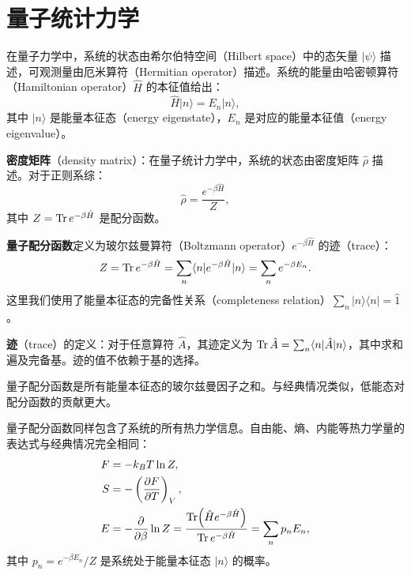 \section{量子统计力学}

在量子力学中，系统的状态由希尔伯特空间（Hilbert space）中的态矢量 $|\psi\rangle$ 描述，可观测量由厄米算符（Hermitian operator）描述。系统的能量由哈密顿算符（Hamiltonian operator）$\hat{H}$ 的本征值给出：
\begin{equation}
    \hat{H} |n\rangle = E_n |n\rangle,
\end{equation}
其中 $|n\rangle$ 是能量本征态（energy eigenstate），$E_n$ 是对应的能量本征值（energy eigenvalue）。

\begin{definition}[密度矩阵]
\textbf{密度矩阵}（density matrix）：在量子统计力学中，系统的状态由密度矩阵 $\hat{\rho}$ 描述。对于正则系综：
\begin{equation}
    \hat{\rho} = \frac{e^{-\beta \hat{H}}}{Z},
\end{equation}
其中 $Z = \Tr e^{-\beta \hat{H}}$ 是配分函数。
\end{definition}

\begin{theorem}[量子正则配分函数]
\textbf{量子配分函数}定义为玻尔兹曼算符（Boltzmann operator）$e^{-\beta \hat{H}}$ 的迹（trace）：
\begin{equation}
    Z = \Tr e^{-\beta \hat{H}} = \sum_n \langle n | e^{-\beta \hat{H}} | n \rangle = \sum_n e^{-\beta E_n}.
\end{equation}
这里我们使用了能量本征态的完备性关系（completeness relation）$\sum_n |n\rangle \langle n| = \hat{1}$。

\textbf{迹}（trace）的定义：对于任意算符 $\hat{A}$，其迹定义为 $\Tr \hat{A} = \sum_n \langle n | \hat{A} | n \rangle$，其中求和遍及完备基。迹的值不依赖于基的选择。
\end{theorem}

量子配分函数是所有能量本征态的玻尔兹曼因子之和。与经典情况类似，低能态对配分函数的贡献更大。

量子配分函数同样包含了系统的所有热力学信息。自由能、熵、内能等热力学量的表达式与经典情况完全相同：
\begin{align}
    F &= -k_B T \ln Z, \\
    S &= -\left(\frac{\partial F}{\partial T}\right)_V, \\
    E &= -\frac{\partial}{\partial \beta} \ln Z = \frac{\Tr(\hat{H} e^{-\beta \hat{H}})}{\Tr e^{-\beta \hat{H}}} = \sum_n p_n E_n,
\end{align}
其中 $p_n = e^{-\beta E_n}/Z$ 是系统处于能量本征态 $|n\rangle$ 的概率。

